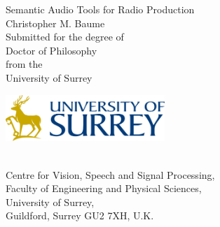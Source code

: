 \documentclass[11pt,a4paper,twoside]{report}
\begin{document}
\begin{titlepage}
  \vspace*{\fill}
  \begin{center}
    {\Huge Semantic Audio Tools for Radio Production}\\[1cm]
    {\Large Christopher M. Baume}\\[1cm]
    {\large Submitted for the degree of\\Doctor of Philosophy\\from the\\
      University of Surrey}\\[1cm]
    \begin{center}
      \includegraphics[width=6cm]{figs/surrey-logo.png}
    \end{center}\\[1cm]
    {\small Centre for Vision, Speech and Signal Processing,\\
      Faculty of Engineering and Physical Sciences,\\
      University of Surrey,\\
      Guildford, Surrey GU2 7XH, U.K.}
  \end{center}
  \vspace*{\fill}
\end{titlepage}





{\singlespacing
\tableofcontents
}

\listoffigures

\listoftables




















\end{document}
